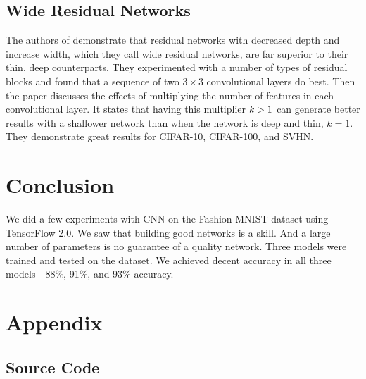 \documentclass{IEEEtran}
\newcommand{\gt}{\symbol{"3E}}
\begin{document}
\subsection{Wide Residual Networks}
The authors of \cite{Zagoruyko_2016} demonstrate that residual networks
\cite{He_2016_CVPR} with decreased depth and increase width, which they call
wide residual networks, are far superior to their thin, deep counterparts. They
experimented with a number of types of residual blocks and found that a sequence
of two \(3\times 3\) convolutional layers do best. Then the paper discusses the
effects of multiplying the number of features in each convolutional layer. It
states that having this multiplier \(k\gt 1\) can generate better results with a
shallower network than when the network is deep and thin, \(k = 1\). They
demonstrate great results for CIFAR-10, CIFAR-100, and SVHN.

\section{Conclusion}
We did a few experiments with CNN on the Fashion MNIST dataset
\cite{xiao2017fashionmnist} using TensorFlow 2.0. We saw that building good
networks is a skill. And a large number of parameters is no guarantee of a
quality network. Three models were trained and tested on the dataset. We
achieved decent accuracy in all three models---88\%, 91\%, and 93\% accuracy.


\section{Appendix}
\subsection{Source Code}











\end{document}
